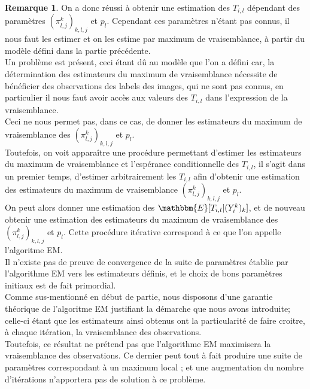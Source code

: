 \documentclass[frenchb]{report}
\newcommand{\1}{\mathbbm{1}}
\newcommand{\E}{\mathbbm{E}}
\theoremstyle{definition}\newtheorem{defn}{Définition}
\theoremstyle{definition}\newtheorem{exm}{Exemple}
\theoremstyle{definition}\newtheorem{nota}{Notation}
\theoremstyle{definition}\newtheorem{rem}{Remarque}
\begin{document}
\begin{rem}
On a donc réussi à obtenir une estimation des $T_{i,l}$ dépendant des paramètres $(\pi^k_{l,j})_{k,l,j}$ et $p_l$. Cependant ces paramètres n'étant pas connus, il nous faut les estimer et on les estime par maximum de vraisemblance, à partir du modèle défini dans la partie précédente.\\
Un problème est présent, ceci étant dû au modèle que l'on a défini car, la détermination des estimateurs du maximum de vraisemblance nécessite de bénéficier des observations des labels des images, qui ne sont pas connus, en particulier il nous faut avoir accès aux valeurs des $T_{i,l}$ dans l'expression de la vraisemblance.\\

Ceci ne nous permet pas, dans ce cas, de donner les estimateurs du maximum de vraisemblance des $(\pi^k_{l,j})_{k,l,j}$ et $p_l$. \\
Toutefois, on voit apparaître une procédure permettant d'estimer les estimateurs du maximum de vraisemblance et l'espérance conditionnelle des $T_{i,l}$, il s'agit dans un premier temps, d'estimer arbitrairement les $T_{i,l}$ afin d'obtenir une estimation des estimateurs du maximum de vraisemblance $(\pi^k_{l,j})_{k,l,j}$ et $p_l$.\\
On peut alors donner une estimation des $\E[T_{i,l}|(Y^k_i)_k]$, et de nouveau obtenir une estimation des estimateurs du maximum de vraisemblance des $(\pi^k_{l,j})_{k,l,j}$ et $p_l$. Cette procédure itérative correspond à ce que l'on appelle l'algoritme EM.\\

Il n'existe pas de preuve de convergence de la suite de paramètres établie par l'algorithme EM vers les estimateurs définis, et le choix de bons paramètres initiaux est de fait primordial.\\
Comme sus-mentionné en début de partie, nous disposons d'une garantie théorique de l'algoritme EM justifiant la démarche que nous avons introduite;  celle-ci étant que les estimateurs ainsi obtenus ont la particularité de faire croitre, à chaque itération, la vraisemblance des observations. \\
Toutefois, ce résultat ne prétend pas que l'algorithme EM maximisera la vraisemblance des observations. Ce dernier peut tout à fait produire une suite de paramètres correspondant à un maximum local ; et une augmentation du nombre d'itérations n'apportera pas de solution à ce problème.\\
\end{rem}
\end{document}
